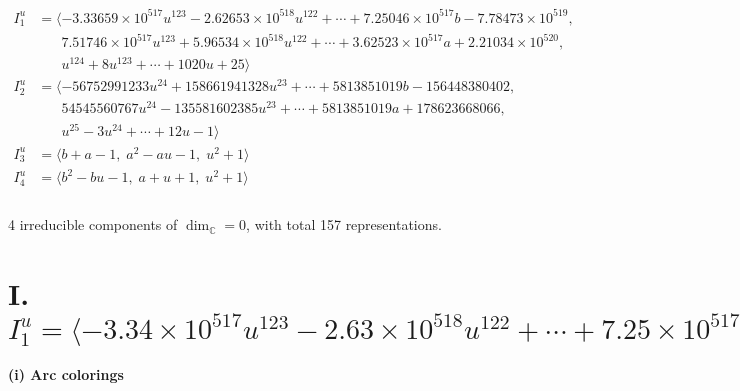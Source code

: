 \documentclass[1p]{elsarticle_modified}
\theoremstyle{definition}
\begin{document}
\begin{align*}
I^u_{1}&=\langle 
-3.33659\times10^{517} u^{123}-2.62653\times10^{518} u^{122}+\cdots+7.25046\times10^{517} b-7.78473\times10^{519},\\
\phantom{I^u_{1}}&\phantom{= \langle  }7.51746\times10^{517} u^{123}+5.96534\times10^{518} u^{122}+\cdots+3.62523\times10^{517} a+2.21034\times10^{520},\\
\phantom{I^u_{1}}&\phantom{= \langle  }u^{124}+8 u^{123}+\cdots+1020 u+25\rangle \\
I^u_{2}&=\langle 
-56752991233 u^{24}+158661941328 u^{23}+\cdots+5813851019 b-156448380402,\\
\phantom{I^u_{2}}&\phantom{= \langle  }54545560767 u^{24}-135581602385 u^{23}+\cdots+5813851019 a+178623668066,\\
\phantom{I^u_{2}}&\phantom{= \langle  }u^{25}-3 u^{24}+\cdots+12 u-1\rangle \\
I^u_{3}&=\langle 
b+a-1,\;a^2- a u-1,\;u^2+1\rangle \\
I^u_{4}&=\langle 
b^2- b u-1,\;a+u+1,\;u^2+1\rangle \\
\\
\end{align*}
\raggedright * 4 irreducible components of $\dim_{\mathbb{C}}=0$, with total 157 representations.\\
\newpage
\renewcommand{\arraystretch}{1}
\centering \section*{I. $I^u_{1}= \langle -3.34\times10^{517} u^{123}-2.63\times10^{518} u^{122}+\cdots+7.25\times10^{517} b-7.78\times10^{519},\;7.52\times10^{517} u^{123}+5.97\times10^{518} u^{122}+\cdots+3.63\times10^{517} a+2.21\times10^{520},\;u^{124}+8 u^{123}+\cdots+1020 u+25 \rangle$}
\flushleft \textbf{(i) Arc colorings}\\
\end{document}
